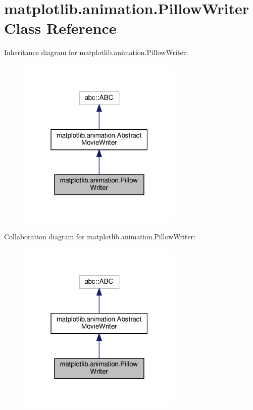 \hypertarget{classmatplotlib_1_1animation_1_1PillowWriter}{}\section{matplotlib.\+animation.\+Pillow\+Writer Class Reference}
\label{classmatplotlib_1_1animation_1_1PillowWriter}


Inheritance diagram for matplotlib.\+animation.\+Pillow\+Writer\+:
\nopagebreak
\begin{figure}[H]
\begin{center}
\leavevmode
\includegraphics[width=223pt]{classmatplotlib_1_1animation_1_1PillowWriter__inherit__graph}
\end{center}
\end{figure}


Collaboration diagram for matplotlib.\+animation.\+Pillow\+Writer\+:
\nopagebreak
\begin{figure}[H]
\begin{center}
\leavevmode
\includegraphics[width=223pt]{classmatplotlib_1_1animation_1_1PillowWriter__coll__graph}
\end{center}
\end{figure}
